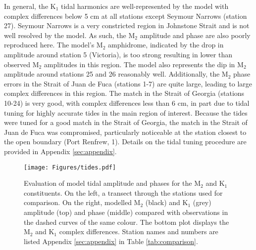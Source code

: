 \documentclass[letterpaper]{tATO2e}
\begin{document}
In general, the K$_1$ tidal harmonics are well-represented by the model with complex differences below 5 cm at all stations except Seymour Narrows (station 27). Seymour Narrows is a very constricted region in Johnstone Strait and is not well resolved by the model. As such, the M$_2$ amplitude and phase are also poorly reproduced here.  The model's M$_2$ amphidrome, indicated by the drop in amplitude around station 5 (Victoria), is too strong resulting in lower than observed M$_2$ amplitudes in this region. {\color{red} The model also represents the dip in M$_2$ amplitude around stations 25 and 26 reasonably well.} Additionally, the M$_2$ phase errors in the Strait of Juan de Fuca (stations 1-7) are quite large, leading to large complex differences in this region.  The match in the Strait of Georgia (stations 10-24) is very good, with complex differences less than 6 cm, in part due to tidal tuning for highly accurate tides in the main region of interest.  {\color{red}Because the tides were tuned for a good match in the Strait of Georgia, the match in the Strait of Juan de Fuca was compromised, particularly noticeable at the station closest to the open boundary (Port Renfrew, 1). } Details on the tidal tuning procedure are provided in Appendix \ref{sec:appendix}.


\begin{figure}
\centering
\texttt{[image: Figures/tides.pdf]}
\caption{Evaluation of model tidal amplitude and phases for the M$_2$ and K$_1$ constituents. On the left, a transect through the stations used for comparison. On the right, modelled M$_2$ (black) and K$_1$ (grey) amplitude (top) and phase (middle) compared with observations in the dashed curves of the same colour. The bottom plot displays the M$_2$ and K$_1$ complex differences. Station names and numbers are listed Appendix \ref{sec:appendix} in Table \ref{tab:comparison}.}
\label{fig:tides}
\end{figure}
\end{document}
